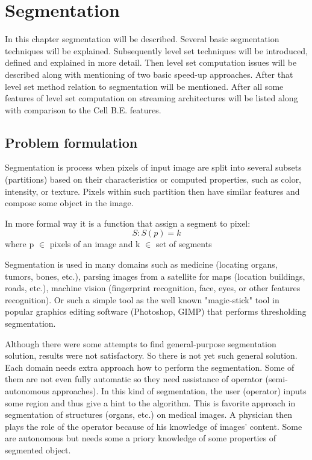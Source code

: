 \chapter{Segmentation}

In this chapter segmentation will be described. Several basic segmentation techniques will be explained.
Subsequently level set techniques will be introduced, defined and explained in more detail.
Then level set computation issues will be described along with mentioning of two basic speed-up approaches.
After that level set method relation to segmentation will be mentioned.
After all some features of level set computation on streaming architectures will be listed along with comparison to the Cell B.E. features.

\section{Problem formulation}
Segmentation is process when pixels of input image are split into several subsets (partitions) based on their characteristics or computed properties, such as color, intensity, or texture.
Pixels within such partition then have similar features and compose some object in the image.

In more formal way it is a function that assign a segment to pixel:
\begin{equation}
S: S(p) = k
\end{equation}
where p $\in$ pixels of an image and k $\in$ set of segments

Segmentation is used in many domains such as medicine (locating organs, tumors, bones, etc.), parsing images from a satellite for maps (location buildings, roads, etc.), machine vision (fingerprint recognition, face, eyes, or other features recognition).
Or such a simple tool as the well known "magic-stick" tool in popular graphics editing software (Photoshop, GIMP) that performs thresholding segmentation.

Although there were some attempts to find general-purpose segmentation solution, results were not satisfactory.
So there is not yet such general solution. Each domain needs extra approach how to perform the segmentation.
Some of them are not even fully automatic so they need assistance of operator (semi-autonomous approaches).
In this kind of segmentation, the user (operator) inputs some region and thus give a hint to the algorithm.
This is favorite approach in segmentation of structures (organs, etc.) on medical images.
A physician then plays the role of the operator because of his knowledge of images' content.
Some are autonomous but needs some a priory knowledge of some properties of segmented object.

